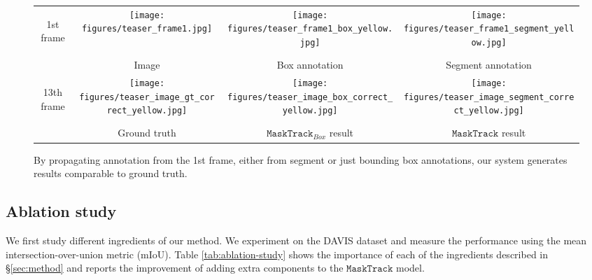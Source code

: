 \documentclass[10pt,twocolumn,letterpaper]{article}
\begin{document}
\begin{figure}
\begin{centering}
\begin{centering}
\begin{tabular}{@{}c@{ }c@{ }c@{ }c@{ }}
\begin{turn}{90}
{\footnotesize{} \hspace{0.5em} 1st frame}
\end{turn}
&\texttt{[image: figures/teaser\_frame1.jpg]} &
\texttt{[image: figures/teaser\_frame1\_box\_yellow.jpg]} &
\texttt{[image: figures/teaser\_frame1\_segment\_yellow.jpg]} \tabularnewline
&\footnotesize{}Image & \footnotesize{}Box annotation & \footnotesize{}Segment annotation\tabularnewline
\begin{turn}{90}
{\footnotesize{} \hspace{0.5em} 13th frame}
\end{turn}
&\texttt{[image: figures/teaser\_image\_gt\_correct\_yellow.jpg]} &
\texttt{[image: figures/teaser\_image\_box\_correct\_yellow.jpg]} &
\texttt{[image: figures/teaser\_image\_segment\_correct\_yellow.jpg]}\tabularnewline
&\footnotesize{}Ground truth & \footnotesize{} $\mathtt{MaskTrack}_{Box}$ result  & \footnotesize{} $\mathtt{MaskTrack}$ result\tabularnewline
\end{tabular}
\par\end{centering}

\par\end{centering}
\caption{\label{fig:teaser}By propagating annotation from the 1st frame, either from segment or just bounding box annotations, our system generates results comparable to ground truth.}
\end{figure}

\subsection{Ablation study}
\label{sec:ablation-study}




We first study different ingredients of our method. We experiment on the DAVIS dataset and measure the performance using the mean intersection-over-union metric (mIoU).
Table \ref{tab:ablation-study} shows the importance of each of the ingredients described in \S\ref{sec:method} and reports the improvement of adding extra components to the $\mathtt{MaskTrack}$ model.
\end{document}
